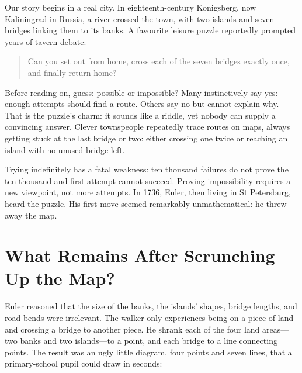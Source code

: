 Our story begins in a real city. In eighteenth-century Konigsberg, now Kaliningrad in Russia, a river crossed the town, with two islands and seven bridges linking them to its banks. A favourite leisure puzzle reportedly prompted years of tavern debate:

\begin{quote}
Can you set out from home, cross each of the seven bridges exactly once, and finally return home?
\end{quote}

Before reading on, guess: possible or impossible? Many instinctively say yes: enough attempts should find a route. Others say no but cannot explain why. That is the puzzle's charm: it sounds like a riddle, yet nobody can supply a convincing answer. Clever townspeople repeatedly trace routes on maps, always getting stuck at the last bridge or two: either crossing one twice or reaching an island with no unused bridge left.

Trying indefinitely has a fatal weakness: ten thousand failures do not prove the ten-thousand-and-first attempt cannot succeed. Proving impossibility requires a new viewpoint, not more attempts. In 1736, Euler, then living in St Petersburg, heard the puzzle. His first move seemed remarkably unmathematical: he threw away the map.

\section{What Remains After Scrunching Up the Map?}

Euler reasoned that the size of the banks, the islands' shapes, bridge lengths, and road bends were irrelevant. The walker only experiences being on a piece of land and crossing a bridge to another piece. He shrank each of the four land areas---two banks and two islands---to a point, and each bridge to a line connecting points. The result was an ugly little diagram, four points and seven lines, that a primary-school pupil could draw in seconds:

\begin{center}
\end{center}

